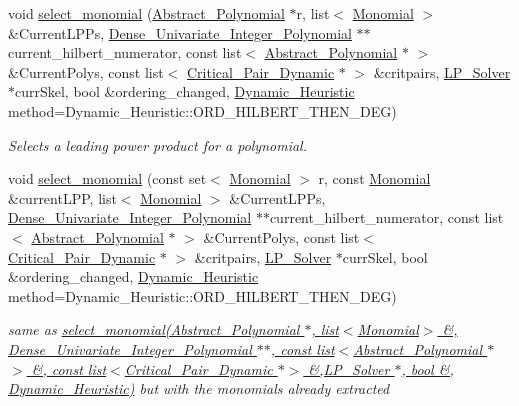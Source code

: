 \begin{DoxyCompactItemize}
void \hyperlink{group___g_b_computation_gaa01d88c431b84deabf51ee116d7d2a0e}{select\+\_\+monomial} (\hyperlink{group__polygroup_class_abstract___polynomial}{Abstract\+\_\+\+Polynomial} $\ast$r, list$<$ \hyperlink{group__polygroup_class_monomial}{Monomial} $>$ \&Current\+L\+P\+Ps, \hyperlink{group__polygroup_class_dense___univariate___integer___polynomial}{Dense\+\_\+\+Univariate\+\_\+\+Integer\+\_\+\+Polynomial} $\ast$$\ast$current\+\_\+hilbert\+\_\+numerator, const list$<$ \hyperlink{group__polygroup_class_abstract___polynomial}{Abstract\+\_\+\+Polynomial} $\ast$ $>$ \&Current\+Polys, const list$<$ \hyperlink{group___g_b_computation_class_critical___pair___dynamic}{Critical\+\_\+\+Pair\+\_\+\+Dynamic} $\ast$ $>$ \&critpairs, \hyperlink{group___c_l_s_solvers_class_l_p___solvers_1_1_l_p___solver}{L\+P\+\_\+\+Solver} $\ast$curr\+Skel, bool \&ordering\+\_\+changed, \hyperlink{group___g_b_computation_ga819b1fd40d9a40ff303df3b90647ecb0}{Dynamic\+\_\+\+Heuristic} method=Dynamic\+\_\+\+Heuristic\+::\+O\+R\+D\+\_\+\+H\+I\+L\+B\+E\+R\+T\+\_\+\+T\+H\+E\+N\+\_\+\+D\+EG)
\begin{DoxyCompactList}\small\item\em Selects a leading power product for a polynomial. \end{DoxyCompactList}\item 
void \hyperlink{group___g_b_computation_ga8b938265dccdb6d410ed2906de4ed5e5}{select\+\_\+monomial} (const set$<$ \hyperlink{group__polygroup_class_monomial}{Monomial} $>$ r, const \hyperlink{group__polygroup_class_monomial}{Monomial} \&current\+L\+PP, list$<$ \hyperlink{group__polygroup_class_monomial}{Monomial} $>$ \&Current\+L\+P\+Ps, \hyperlink{group__polygroup_class_dense___univariate___integer___polynomial}{Dense\+\_\+\+Univariate\+\_\+\+Integer\+\_\+\+Polynomial} $\ast$$\ast$current\+\_\+hilbert\+\_\+numerator, const list$<$ \hyperlink{group__polygroup_class_abstract___polynomial}{Abstract\+\_\+\+Polynomial} $\ast$ $>$ \&Current\+Polys, const list$<$ \hyperlink{group___g_b_computation_class_critical___pair___dynamic}{Critical\+\_\+\+Pair\+\_\+\+Dynamic} $\ast$ $>$ \&critpairs, \hyperlink{group___c_l_s_solvers_class_l_p___solvers_1_1_l_p___solver}{L\+P\+\_\+\+Solver} $\ast$curr\+Skel, bool \&ordering\+\_\+changed, \hyperlink{group___g_b_computation_ga819b1fd40d9a40ff303df3b90647ecb0}{Dynamic\+\_\+\+Heuristic} method=Dynamic\+\_\+\+Heuristic\+::\+O\+R\+D\+\_\+\+H\+I\+L\+B\+E\+R\+T\+\_\+\+T\+H\+E\+N\+\_\+\+D\+EG)
\begin{DoxyCompactList}\small\item\em same as {\ttfamily \hyperlink{group___g_b_computation_gaa01d88c431b84deabf51ee116d7d2a0e}{select\+\_\+monomial(\+Abstract\+\_\+\+Polynomial $\ast$, list$<$\+Monomial$>$ \&, Dense\+\_\+\+Univariate\+\_\+\+Integer\+\_\+\+Polynomial $\ast$$\ast$, const list$<$\+Abstract\+\_\+\+Polynomial $\ast$$>$ \&, const list$<$\+Critical\+\_\+\+Pair\+\_\+\+Dynamic $\ast$$>$ \&,\+L\+P\+\_\+\+Solver $\ast$, bool \&, Dynamic\+\_\+\+Heuristic)}} but with the monomials already extracted \end{DoxyCompactList}\item 

\end{DoxyCompactItemize}
